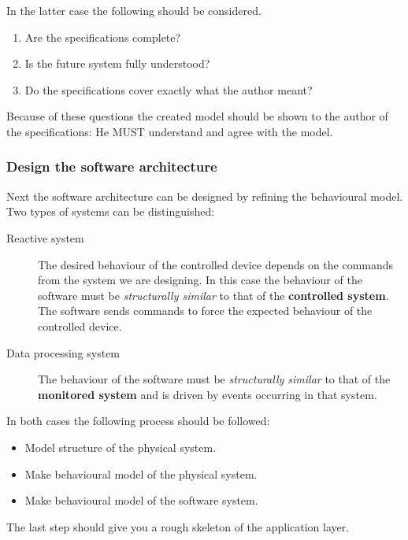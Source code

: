 \documentclass[../main.tex]{subfiles}
\begin{document}
In the latter case the following should be considered.
\begin{enumerate}
	\item Are the specifications complete?
	\item Is the future system fully understood?
	\item Do the specifications cover exactly what the author meant?  
\end{enumerate}
Because of these questions the created model should be shown to the author of the specifications: He MUST understand and agree with the model.




\subsubsection{Design the software architecture}
\label{sss:design}
Next the software architecture can be designed by refining the behavioural model. 
Two types of systems can be distinguished:
\begin{description}
	\item[Reactive system] The desired behaviour of the controlled device depends on the commands from the system we are designing.
		In this case the behaviour of the software must be \emph{structurally similar} to that of the \textbf{controlled system}.
		The software sends commands to force the expected behaviour of the controlled device.
	\item[Data processing system] The behaviour of the software must be \emph{structurally similar} to that of the \textbf{monitored system} and is driven by events occurring in that system.
\end{description}

In both cases the following process should be followed:
\begin{itemize}
	\item Model structure of the physical system. 
	\item Make behavioural model of the physical system.
	\item Make behavioural model of the software system.
\end{itemize}

The last step should give you a rough skeleton of the application layer.
\end{document}
